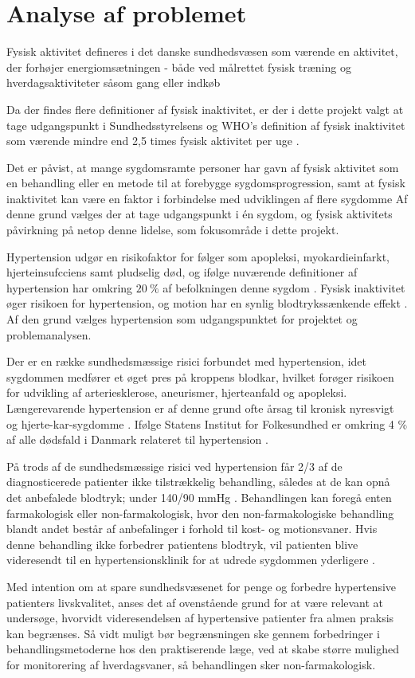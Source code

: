 \section{Analyse af problemet}
Fysisk aktivitet defineres i det danske sundhedsvæsen som værende en aktivitet, der forhøjer energiomsætningen - både ved målrettet fysisk træning og hverdagsaktiviteter såsom gang eller indkøb \citep{motionsraad2007, terkelsen2015}

Da der findes flere definitioner af fysisk inaktivitet, er der i dette projekt valgt at tage udgangspunkt i Sundhedsstyrelsens og WHO's definition af fysisk inaktivitet som værende mindre end 2,5 times fysisk aktivitet per uge \citep{motionsraad2007}. 

Det er påvist, at mange sygdomsramte personer har gavn af fysisk aktivitet som en behandling eller en metode til at forebygge sygdomsprogression, samt at fysisk inaktivitet kan være en faktor i forbindelse med udviklingen af flere sygdomme \citep{motionsraad2007,pedersen2011}
Af denne grund vælges der at tage udgangspunkt i én sygdom, og fysisk aktivitets påvirkning på netop denne lidelse, som fokusområde i dette projekt.

Hypertension udgør en risikofaktor for følger som apopleksi, myokardieinfarkt, hjerteinsufcciens samt pludselig død, og ifølge nuværende definitioner af hypertension har omkring $20~\%$ af befolkningen denne sygdom \citep{pedersen2011}. Fysisk inaktivitet øger risikoen for hypertension, og motion har en synlig blodtrykssænkende effekt \citep{olsen2015}. Af den grund vælges hypertension som udgangspunktet for projektet og problemanalysen. 

Der er en række sundhedsmæssige risici forbundet med hypertension, idet sygdommen medfører et øget pres på kroppens blodkar, hvilket forøger risikoen for udvikling af arteriesklerose, aneurismer, hjerteanfald og apopleksi. Længerevarende hypertension er af denne grund ofte årsag til kronisk nyresvigt og hjerte-kar-sygdomme \citep{martini2015}. Ifølge Statens Institut for Folkesundhed er omkring 4 \% af alle dødsfald i Danmark relateret til hypertension \citep{juel2006}.

På trods af de sundhedsmæssige risici ved hypertension får 2/3 af de diagnosticerede patienter ikke tilstrækkelig behandling, således at de kan opnå det anbefalede blodtryk; under 140/90 mmHg \citep{martini2015, paulsen2012}. Behandlingen kan foregå enten farmakologisk eller non-farmakologisk, hvor den non-farmakologiske behandling blandt andet består af anbefalinger i forhold til kost- og motionsvaner. Hvis denne behandling ikke forbedrer patientens blodtryk, vil patienten blive videresendt til en hypertensionsklinik for at udrede sygdommen yderligere \cite{lodberg2016, bech2015}.

Med intention om at spare sundhedsvæsenet for penge og forbedre hypertensive patienters livskvalitet, anses det af ovenstående grund for at være relevant at undersøge, hvorvidt videresendelsen af hypertensive patienter fra almen praksis kan begrænses. Så vidt muligt bør begrænsningen ske gennem forbedringer i behandlingsmetoderne hos den praktiserende læge, ved at skabe større mulighed for monitorering af hverdagsvaner, så behandlingen sker non-farmakologisk.